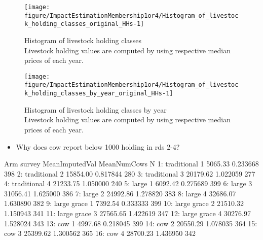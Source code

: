 \begin{Schunk}
\begin{figure}

{\centering \texttt{[image: figure/ImpactEstimationMembership1or4/Histogram\_of\_livestock\_holding\_classes\_original\_HHs-1]} 

}

\caption{Histogram of livestock holding classes\\ {\footnotesize Livestock holding values are computed by using respective median prices of each year.\setlength{\baselineskip}{8pt}}}\label{Figure Histogram of livestock holding classes original HHs}
\end{figure}
\end{Schunk}
\begin{Schunk}
\begin{figure}

{\centering \texttt{[image: figure/ImpactEstimationMembership1or4/Histogram\_of\_livestock\_holding\_classes\_by\_year\_original\_HHs-1]} 

}

\caption{Histogram of livestock holding classes by year\\ {\footnotesize Livestock holding values are computed by using respective median prices of each year.\setlength{\baselineskip}{8pt}}}\label{Figure Histogram of livestock holding classes by year original HHs}
\end{figure}
\end{Schunk}
\begin{itemize}
\vspace{1.0ex}\setlength{\itemsep}{1.0ex}\setlength{\baselineskip}{12pt}
\item	Why does \textsf{cow} report below 1000 holding in rds 2-4?
\end{itemize}
\begin{Schunk}
\begin{Soutput}
            Arm survey MeanImputedVal MeanNumCows   N
 1: traditional      1        5065.33    0.233668 398
 2: traditional      2       15854.00    0.817844 280
 3: traditional      3       20179.62    1.022059 277
 4: traditional      4       21233.75    1.050000 240
 5:       large      1        6092.42    0.275689 399
 6:       large      3       31056.41    1.625000 386
 7:       large      2       24992.86    1.278820 383
 8:       large      4       32686.07    1.630890 382
 9: large grace      1        7392.54    0.333333 399
10: large grace      2       21510.32    1.150943 341
11: large grace      3       27565.65    1.422619 347
12: large grace      4       30276.97    1.528024 343
13:         cow      1        4997.68    0.218045 399
14:         cow      2       20550.29    1.078035 364
15:         cow      3       25399.62    1.300562 365
16:         cow      4       28700.23    1.436950 342
\end{Soutput}
\end{Schunk}
